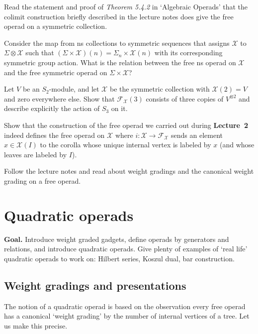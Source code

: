\documentclass[fleqn, a4paper, twoside]{article}
\newcommand{\0}{\langle 0\rangle}
\newcommand{\XX}{\mathcal{X}}
\DeclareRobustCommand{\[}{\begin{equation}}%
\DeclareRobustCommand{\]}{\end{equation}}%
\theoremstyle{mytheorem}
\theoremstyle{introthm}
\theoremstyle{mydefinition}
\theoremstyle{mydefinition2}
\theoremstyle{plain} %
\newcommand{\?}{\,?\,}
\theoremstyle{mytheorem}
\theoremstyle{plain} %
\newcommand\blankpage{%
    \null
    \thispagestyle{empty}%
    \newpage}
\begin{document}
\begin{question}\label{ex:colim}
Read the statement and proof of \emph{Theorem 5.4.2} in
`Algebraic Operads' that the colimit construction briefly
described in the lecture notes does give the free
operad on a symmetric collection.
\end{question}

\begin{question}
Consider the map from ns collections to symmetric sequences
that assigns $\XX$ to $\Sigma\otimes \XX$ such that
$(\Sigma\times \XX)(n) = \Sigma_n\times \XX(n)$ with its
corresponding symmetric group action. What is the relation
between the free ns operad on $\XX$ and the free symmetric
operad on $\Sigma\times \XX$?
\end{question}

\begin{question}
Let $V$ be an $S_2$-module, and let $\XX$ be the
symmetric collection with $\XX(2) = V$ and zero
everywhere else. Show that $\mathcal{F}_\XX(3)$
consists of three copies of $V^{\otimes 2}$ and
describe explicitly the action of $S_3$ on it.
\end{question}

\begin{question}
Show that the construction of the free operad we carried
out during \textbf{Lecture~2} indeed defines the free
operad on $\XX$ where $i:\XX \longrightarrow \mathcal F_\XX$
sends an element $x\in \XX(I)$ to the corolla whose unique
internal vertex is labeled by $x$ (and whose
leaves are labeled by $I$). 
\end{question}

 \begin{question}
 Follow the lecture notes and read about 
 weight gradings and the canonical weight
 grading on a free operad. 
 \end{question}

\afterpage{\blankpage}
\newpage

\section{Quadratic operads}\label{lecture:quadraticops}

 \textbf{Goal.} Introduce weight graded gadgets,
 define operads by generators and relations, and
 introduce quadratic operads. Give plenty of examples
 of `real life' quadratic operads to work on:
 Hilbert series, Koszul dual, bar construction. 
 
 \subsection{Weight gradings and presentations}
 The notion of a quadratic operad is based on the observation
 every free operad has a canonical `weight grading' by the
 number of internal vertices of a tree. Let us make this
 precise.
 
\end{document}
